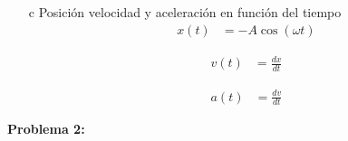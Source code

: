 \documentclass[letterpaper,12pt,addpoints]{exam}
\begin{document}
{\begin{enumerate}
\item[c] Posición velocidad y aceleración en función del tiempo
\begin{align*}
x(t) &= -A\cos(\omega t)
\end{align*}
\begin{center}
\end{center}

\begin{minipage}[t]{0.5\textwidth}
\begin{align*}
v(t) &= \frac{dx}{dt}
\end{align*}
\begin{center}
\end{center}

\end{minipage}
\begin{minipage}[t]{0.5\textwidth}
\begin{align*}
a(t) &= \frac{dv}{dt}
\end{align*}
\begin{center}
\end{center}
\end{minipage}


\end{enumerate}
}
\clearpage
\textbf{Problema 2:}
\end{document}
